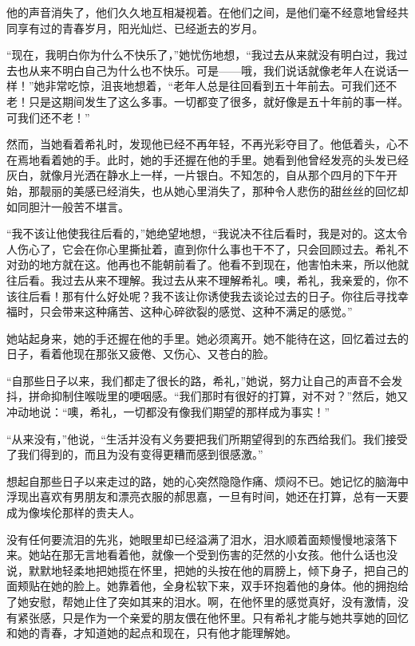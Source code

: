 \par 他的声音消失了，他们久久地互相凝视着。在他们之间，是他们毫不经意地曾经共同享有过的青春岁月，阳光灿烂、已经逝去的岁月。
\par “现在，我明白你为什么不快乐了，”她忧伤地想，“我过去从来就没有明白过，我过去也从来不明白自己为什么也不快乐。可是——哦，我们说话就像老年人在说话一样！”她非常吃惊，沮丧地想着，“老年人总是往回看到五十年前去。可我们还不老！只是这期间发生了这么多事。一切都变了很多，就好像是五十年前的事一样。可我们还不老！”
\par 然而，当她看着希礼时，发现他已经不再年轻，不再光彩夺目了。他低着头，心不在焉地看着她的手。此时，她的手还握在他的手里。她看到他曾经发亮的头发已经灰白，就像月光洒在静水上一样，一片银白。不知怎的，自从那个四月的下午开始，那靓丽的美感已经消失，也从她心里消失了，那种令人悲伤的甜丝丝的回忆却如同胆汁一般苦不堪言。
\par “我不该让他使我往后看的，”她绝望地想，“我说决不往后看时，我是对的。这太令人伤心了，它会在你心里撕扯着，直到你什么事也干不了，只会回顾过去。希礼不对劲的地方就在这。他再也不能朝前看了。他看不到现在，他害怕未来，所以他就往后看。我过去从来不理解。我过去从来不理解希礼。噢，希礼，我亲爱的，你不该往后看！那有什么好处呢？我不该让你诱使我去谈论过去的日子。你往后寻找幸福时，只会带来这种痛苦、这种心碎欲裂的感觉、这种不满足的感觉。”
\par 她站起身来，她的手还握在他的手里。她必须离开。她不能待在这，回忆着过去的日子，看着他现在那张又疲倦、又伤心、又苍白的脸。
\par “自那些日子以来，我们都走了很长的路，希礼，”她说，努力让自己的声音不会发抖，拼命抑制住喉咙里的哽咽感。“我们那时有很好的打算，对不对？”然后，她又冲动地说：“噢，希礼，一切都没有像我们期望的那样成为事实！”
\par “从来没有，”他说，“生活并没有义务要把我们所期望得到的东西给我们。我们接受了我们得到的，而且为没有变得更糟而感到很感激。”
\par 想起自那些日子以来走过的路，她的心突然隐隐作痛、烦闷不已。她记忆的脑海中浮现出喜欢有男朋友和漂亮衣服的郝思嘉，一旦有时间，她还在打算，总有一天要成为像埃伦那样的贵夫人。
\par 没有任何要流泪的先兆，她眼里却已经溢满了泪水，泪水顺着面颊慢慢地滚落下来。她站在那无言地看着他，就像一个受到伤害的茫然的小女孩。他什么话也没说，默默地轻柔地把她揽在怀里，把她的头按在他的肩膀上，倾下身子，把自己的面颊贴在她的脸上。她靠着他，全身松软下来，双手环抱着他的身体。他的拥抱给了她安慰，帮她止住了突如其来的泪水。啊，在他怀里的感觉真好，没有激情，没有紧张感，只是作为一个亲爱的朋友偎在他怀里。只有希礼才能与她共享她的回忆和她的青春，才知道她的起点和现在，只有他才能理解她。
